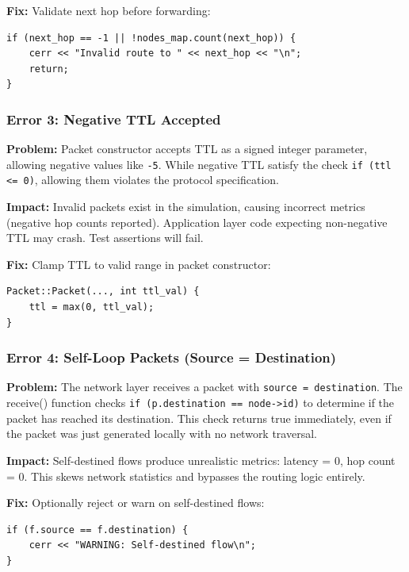 \documentclass[11pt,a4paper]{article}
\begin{document}
\textbf{Fix:}
Validate next hop before forwarding:
\begin{lstlisting}
if (next_hop == -1 || !nodes_map.count(next_hop)) {
    cerr << "Invalid route to " << next_hop << "\n";
    return;
}
\end{lstlisting}

\vspace{0.5cm}

\subsubsection{Error 3: Negative TTL Accepted}

\textbf{Problem:}
Packet constructor accepts TTL as a signed integer parameter, allowing negative values like \texttt{-5}. While negative TTL satisfy the check \texttt{if (ttl <= 0)}, allowing them violates the protocol specification.

\textbf{Impact:}
Invalid packets exist in the simulation, causing incorrect metrics (negative hop counts reported). Application layer code expecting non-negative TTL may crash. Test assertions will fail.

\textbf{Fix:}
Clamp TTL to valid range in packet constructor:
\begin{lstlisting}
Packet::Packet(..., int ttl_val) {
    ttl = max(0, ttl_val);
}
\end{lstlisting}

\vspace{0.5cm}

\subsubsection{Error 4: Self-Loop Packets (Source = Destination)}

\textbf{Problem:}
The network layer receives a packet with \texttt{source = destination}. The receive() function checks \texttt{if (p.destination == node->id)} to determine if the packet has reached its destination. This check returns true immediately, even if the packet was just generated locally with no network traversal.

\textbf{Impact:}
Self-destined flows produce unrealistic metrics: latency = 0, hop count = 0. This skews network statistics and bypasses the routing logic entirely.

\textbf{Fix:}
Optionally reject or warn on self-destined flows:
\begin{lstlisting}
if (f.source == f.destination) {
    cerr << "WARNING: Self-destined flow\n";
}
\end{lstlisting}
\end{document}

